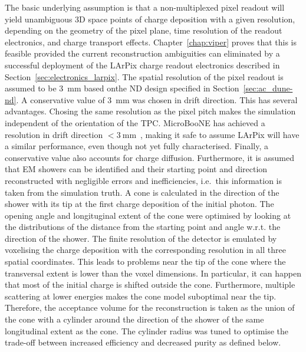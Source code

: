 The basic underlying assumption is that a non-multiplexed pixel readout will yield unambiguous 3D space points of charge deposition with a given resolution, depending on the geometry of the pixel plane, time resolution of the readout electronics, and charge transport effects.
Chapter~\ref{chap:viper} proves that this is feasible provided the current reconstruction ambiguities can eliminated by a successful deployment of the LArPix charge readout electronics described in Section~\ref{sec:electronics_larpix}.
The spatial resolution of the pixel readout is assumed to be \SI{3}{\milli\metre} based onthe ND design specified in Section~\ref{sec:ac_dune-nd}.
A conservative value of \SI{3}{\milli\meter} was chosen in drift direction.
This has several advantages.
Chosing the same resolution as the pixel pitch makes the simulation independent of the orientation of the TPC.
MicroBooNE has achieved a resolution in drift direction $< \SI{3}{\milli\metre}$~\cite{uboone}, making it safe to assume LArPix will have a similar performance, even though not yet fully characterised.
Finally, a conservative value also accounts for charge diffusion.
Furthermore, it is assumed that EM showers can be identified and their starting point and direction reconstructed with negligible errors and inefficiencies, i.e.\ this information is taken from the simulation truth.
A cone is calculated in the direction of the shower with its tip at the first charge deposition of the initial photon.
The opening angle and longituginal extent of the cone were optimised by looking at the distributions of the distance from the starting point and angle w.r.t. the direction of the shower.
The finite resolution of the detector is emulated by voxelising the charge deposition with the corresponding resolution in all three spatial coordinates.
This leads to problems near the tip of the cone where the transversal extent is lower than the voxel dimensions.
In particular, it can happen that most of the initial charge is shifted outside the cone.
Furthermore, multiple scattering at lower energies makes the cone model suboptimal near the tip.
Therefore, the acceptance volume for the reconstruction is taken as the union of the cone with a cylinder around the direction of the shower of the same longitudinal extent as the cone.
The cylinder radius was tuned to optimise the trade-off between increased efficiency and decreased purity as defined below.

